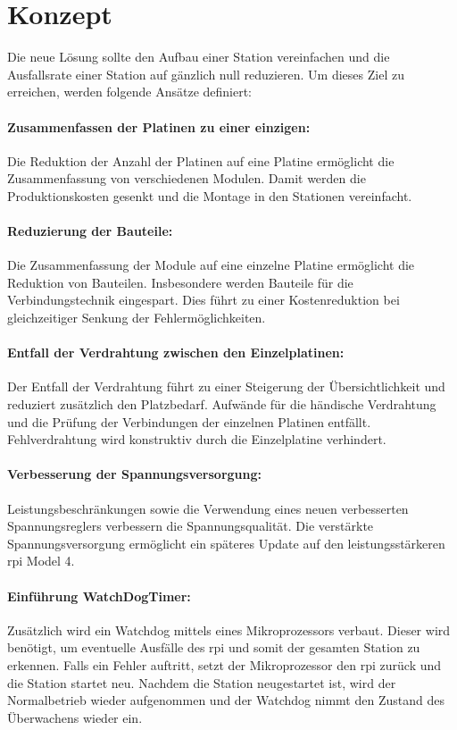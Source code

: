 \section{Konzept}
Die neue Lösung sollte den Aufbau einer Station vereinfachen und die Ausfallsrate einer Station auf gänzlich null reduzieren.
Um dieses Ziel zu erreichen, werden folgende Ansätze definiert:

\paragraph{Zusammenfassen der Platinen zu einer einzigen:}
Die Reduktion der Anzahl der Platinen auf eine Platine ermöglicht die Zusammenfassung von verschiedenen Modulen.
Damit werden die Produktionskosten gesenkt und die Montage in den Stationen vereinfacht.

\paragraph{Reduzierung der Bauteile:}
Die Zusammenfassung der Module auf eine einzelne Platine ermöglicht die Reduktion von Bauteilen.
Insbesondere werden Bauteile für die Verbindungstechnik eingespart.
Dies führt zu einer Kostenreduktion bei gleichzeitiger Senkung der Fehlermöglichkeiten. 

\paragraph{Entfall der Verdrahtung zwischen den Einzelplatinen:}
Der Entfall der Verdrahtung führt zu einer Steigerung der Übersichtlichkeit und reduziert zusätzlich den Platzbedarf.
Aufwände für die händische Verdrahtung und die Prüfung der Verbindungen der einzelnen Platinen entfällt.
Fehlverdrahtung wird konstruktiv durch die Einzelplatine verhindert.

\paragraph{Verbesserung der Spannungsversorgung:}
Leistungsbeschränkungen sowie die Verwendung eines neuen verbesserten Spannungsreglers verbessern die Spannungsqualität.
Die verstärkte Spannungsversorgung ermöglicht ein späteres Update auf den leistungsstärkeren \ac{rpi} Model 4.

\paragraph{Einführung WatchDogTimer:}
Zusätzlich wird ein Watchdog mittels eines Mikroprozessors verbaut.
Dieser wird benötigt, um eventuelle Ausfälle des \ac{rpi} und somit der gesamten Station zu erkennen.
Falls ein Fehler auftritt, setzt der Mikroprozessor den \ac{rpi} zurück und die Station startet neu.
Nachdem die Station neugestartet ist, wird der Normalbetrieb wieder aufgenommen und der Watchdog nimmt den Zustand des Überwachens wieder ein.

